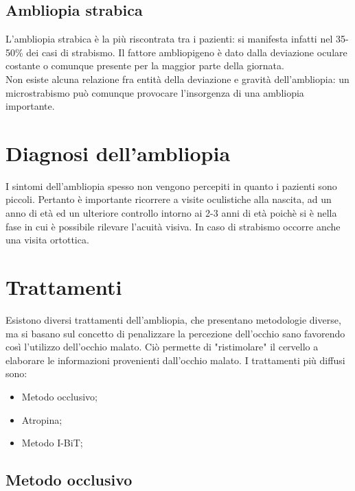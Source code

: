 \documentclass[12pt,a4paper,openright,twoside]{book}
\begin{document}
	\subsection{Ambliopia strabica} 
	L'ambliopia strabica è la più riscontrata tra i pazienti: si manifesta infatti nel 35-50\% dei casi di strabismo. Il fattore ambliopigeno è dato dalla deviazione oculare costante o comunque presente per la
	maggior parte della giornata. \\
	Non esiste alcuna relazione fra entità della deviazione e gravità dell’ambliopia: un microstrabismo
	può comunque provocare l’insorgenza di una ambliopia importante. 
    \section{Diagnosi dell'ambliopia}
    I sintomi dell'ambliopia spesso non vengono percepiti in quanto i pazienti sono piccoli. Pertanto è importante ricorrere a visite oculistiche alla nascita, ad un anno di età ed un ulteriore controllo intorno ai 2-3 anni di età poichè si è nella fase in 
    cui è possibile rilevare l'acuità visiva. In caso di strabismo occorre anche una visita ortottica.
    \section{Trattamenti}
    Esistono diversi trattamenti dell'ambliopia, che presentano metodologie diverse, ma si basano sul concetto di penalizzare la percezione dell'occhio sano favorendo così l'utilizzo dell'occhio malato. Ciò permette di "ristimolare" il cervello a elaborare le informazioni 
    provenienti dall'occhio malato. I trattamenti più diffusi sono:
    \begin{itemize}
    	\item Metodo occlusivo;
    	\item Atropina;
    	\item Metodo I-BiT;
    \end{itemize}
    \subsection{Metodo occlusivo}
  
\end{document}
